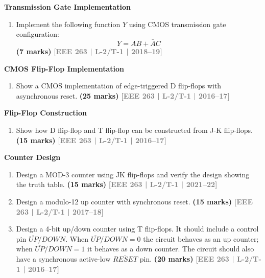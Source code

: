 \documentclass[12pt,a4paper]{article}
\newcommand{\yr}[1]{\hfill\textcolor{gray}{\small\textbf{[#1]}}}
\newcommand{\mk}[1]{\textcolor{orange!70!black}{\small\textbf{(#1 marks)}}}
\newcommand{\subtopic}[2]{%
  \vspace{10pt}
  \noindent\begin{tcolorbox}[colback=#1!8,colframe=#1,boxrule=0.6pt,arc=4pt,
    left=6pt,right=6pt,top=4pt,bottom=4pt]
    \small\bfseries\textcolor{#1}{#2}
  \end{tcolorbox}
  \vspace{2pt}
}
\begin{document}
\subtopic{cD}{Transmission Gate Implementation}
\label{sub:s9-tg}

\begin{enumerate}

\item Implement the following function $Y$ using CMOS transmission gate configuration:
\[
Y = AB + \bar{A}C
\]
\mk{7} \yr{EEE 263 | L-2/T-1 | 2018--19}

\end{enumerate}

\subtopic{cD}{CMOS Flip-Flop Implementation}
\label{sub:s9-ff-cmos}

\begin{enumerate}

\item Show a CMOS implementation of edge-triggered D flip-flops with asynchronous reset.
\mk{25} \yr{EEE 263 | L-2/T-1 | 2016--17}

\end{enumerate}

\subtopic{cD}{Flip-Flop Construction}
\label{sub:s9-ff-construction}

\begin{enumerate}

\item Show how D flip-flop and T flip-flop can be constructed from J-K flip-flops.
\mk{15} \yr{EEE 263 | L-2/T-1 | 2016--17}

\end{enumerate}

\subtopic{cD}{Counter Design}
\label{sub:s9-counter}

\begin{enumerate}

\item Design a MOD-3 counter using JK flip-flops and verify the design showing the truth table.
\mk{15} \yr{EEE 263 | L-2/T-1 | 2021--22}

\item Design a modulo-12 up counter with synchronous reset.
\mk{15} \yr{EEE 263 | L-2/T-1 | 2017--18}

\item Design a 4-bit up/down counter using T flip-flops. It should include a control pin $\overline{UP}/DOWN$. When $\overline{UP}/DOWN=0$ the circuit behaves as an up counter; when $\overline{UP}/DOWN=1$ it behaves as a down counter. The circuit should also have a synchronous active-low $\overline{RESET}$ pin.
\mk{20} \yr{EEE 263 | L-2/T-1 | 2016--17}

\end{enumerate}
\end{document}

